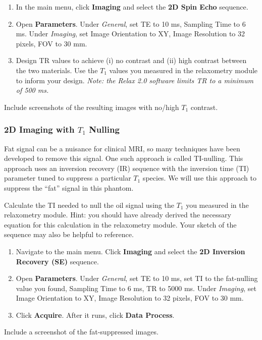 \begin{enumerate}
    \item   In the main menu, click \textbf{Imaging} and select the \textbf{2D Spin Echo} sequence.
    \item   Open \textbf{Parameters}. Under \emph{General}, set TE to 10 ms, Sampling Time to 6 ms. Under \emph{Imaging}, set Image Orientation to XY, Image Resolution to 32 pixels, FOV to 30 mm.
    \item   Design TR values to achieve (i) no contrast and (ii) high contrast between the two materials. Use the $T_1$ values you measured in the relaxometry module to inform your design. \emph{Note: the Relax 2.0 software limits TR to a minimum of 500 ms.}
 \end{enumerate}

 \color{red} \noindent
 Include screenshots of the resulting images with no/high $T_1$ contrast.
 \color{black}

\subsubsection{2D Imaging with $T_1$ Nulling} \label{sec:2d-T1}

Fat signal can be a nuisance for clinical MRI, so many techniques have been developed to remove this signal. One such approach is called TI-nulling. This approach uses an inversion recovery (IR) sequence with the inversion time (TI) parameter tuned to suppress a particular $T_1$ species. We will use this approach to suppress the ``fat'' signal in this phantom.

\color{red}
Calculate the TI needed to null the oil signal using the $T_1$ you measured in the relaxometry module. Hint: you should have already derived the necessary equation for this calculation in the relaxometry module. Your sketch of the sequence may also be helpful to reference.
\color{black}

\begin{enumerate}
    \item   Navigate to the main menu. Click \textbf{Imaging} and select the \textbf{2D Inversion Recovery (SE)} sequence.
    \item   Open \textbf{Parameters}. Under \emph{General}, set TE to 10 ms, set TI to the fat-nulling value you found, Sampling Time to 6 ms, TR to 5000 ms. Under \emph{Imaging}, set Image Orientation to XY, Image Resolution to 32 pixels, FOV to 30 mm.
    \item   Click \textbf{Acquire}. After it runs, click \textbf{Data Process}.
 \end{enumerate}

\noindent{}\color{red}
Include a screenshot of the fat-suppressed images.
\color{black}


